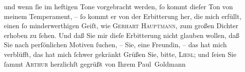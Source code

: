                und wenn{ }ſie im heftigen Tone vorgebracht werden,{ }ſo kommt dieſer Ton von meinem
               Temperament, –{ }ſo kommt er von der Erbitterung her, die mich erfüllt, einen{ }ſo
               minderwerthigen Geiſt, wie \textsc{Gerhart Hauptmann}, zum großen Dichter erhoben zu{ }ſehen. Und daß Sie mir dieſe Erbitterung nicht
               glauben wollen, daß Sie nach perſönlichen Motiven{ }ſuchen, – Sie, eine Freundin, – das
               hat mich verblüfft, das hat mich{ }ſchwer gekränkt{\dotsfive}\pend
           \pstart Grüßen Sie, bitte, \textsc{Liesl}; und{ }ſeien Sie{ }ſammt \textsc{Arthur} herzlichſt gegrüßt von Ihrem \spacefill\mbox{Paul Goldmann}\pend{}\endnumbering{}  \newcommand{\dateiname}{L03535}\newcommand{\titel}{Paul Goldmann an Olga Gussmann, 15. 11. [1901]}\newcommand{\editorInnen}{Martin Anton Müller und Laura Untner}
